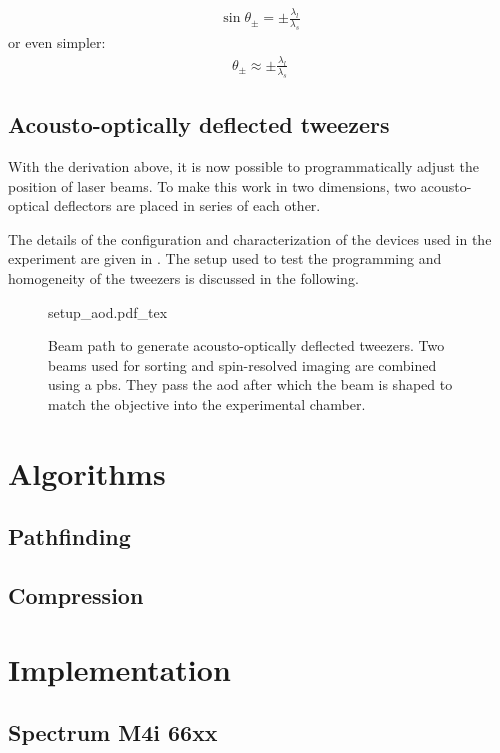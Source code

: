 \begin{align}
	\sin \theta_\pm = \pm \frac{\lambda_l}{\lambda_s}
\end{align}
or even simpler:
\begin{align}
	\theta_\pm \approx \pm \frac{\lambda_l}{\lambda_s}
\end{align}

\begin{figure}[t]
\end{figure}

\subsection{Acousto-optically deflected tweezers}

With the derivation above, it is now possible to programmatically adjust the position of laser beams. To make this work in two dimensions, two acousto-optical deflectors are placed in series of each other. 

The details of the configuration and characterization of the devices used in the experiment are given in \cite{Osterholz2020}. The setup used to test the programming and homogeneity of the tweezers is discussed in the following.

\begin{figure}[t]
\centering
	{setup_aod.pdf_tex}
	\caption{Beam path to generate acousto-optically deflected tweezers. Two beams used for sorting and spin-resolved imaging are combined using a \ac{pbs}. They pass the \ac{aod} after which the beam is shaped to match the objective into the experimental chamber.}
\label{fig:setup_aod}
\end{figure}

\section{Algorithms}

\subsection{Pathfinding}
\subsection{Compression}
\section{Implementation}
\subsection{Spectrum M4i 66xx}

